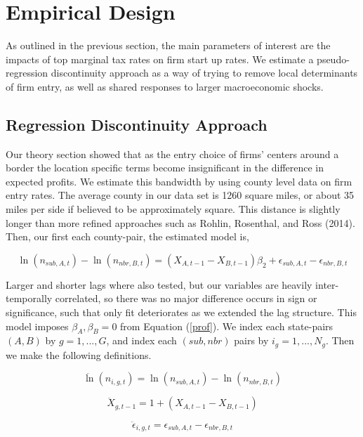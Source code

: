 \section{Empirical Design}

As outlined in the previous section, the main parameters of interest are the impacts of top marginal tax rates on firm start up rates. We estimate a pseudo-regression discontinuity approach as a way of trying to remove local determinants of firm entry, as well as shared responses to larger macroeconomic shocks.

\subsection{Regression Discontinuity Approach}

Our theory section showed that as the entry choice of firms' centers around a border the location specific terms become insignificant in the difference in expected profits. We estimate this bandwidth by using county level data on firm entry rates. The average county in our data set is 1260 square miles, or about 35 miles per side if believed to be approximately square. This distance is slightly longer than more refined approaches such as Rohlin, Rosenthal, and Ross (2014). Then, our first each county-pair, the estimated model is,

\begin{equation}\label{pref}
\ln(n_{sub,A,t})-\ln(n_{nbr,B,t}) = (X_{A,t-1}-X_{B,t-1})\beta_{2} + \epsilon_{sub,A,t}-\epsilon_{nbr,B,t}
\end{equation}

Larger and shorter lags where also tested, but our variables are heavily inter-temporally correlated, so there was no major difference occurs in sign or significance, such that only fit deteriorates as we extended the lag structure. This model imposes $\beta_{A},\beta_{B} = 0$ from Equation (\ref{prof}). We index each state-pairs $(A,B)$ by $g = 1,...,G$, and index each $(sub, nbr)$ pairs by $ i_{g} = 1,...,N_{g}$. Then we make the following definitions.

\begin{equation}
\ddot \ln(n_{i,g,t}) = \ln(n_{sub,A,t})-\ln(n_{nbr,B,t})
\end{equation}

\begin{equation}
\ddot X_{g,t-1} = 1+(X_{A,t-1}-X_{B,t-1})
\end{equation}

\begin{equation}
\ddot \epsilon_{i,g,t} = \epsilon_{sub,A,t}-\epsilon_{nbr,B,t}
\end{equation}

